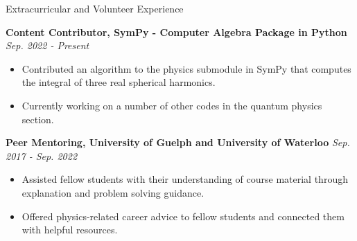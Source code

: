 \documentclass{resume} %
\begin{document}
\vspace{1em}

\begin{rSection}{Extracurricular and Volunteer Experience}


{\bf{Content Contributor, SymPy - Computer Algebra Package in Python}}
\hfill\textit{{Sep. 2022 - Present}}
\begin{itemize}
\item Contributed an algorithm to the physics submodule in SymPy that computes the integral of three real spherical harmonics.
\item Currently working on a number of other codes in the quantum physics section.
\end{itemize}


{\bf{Peer Mentoring, University of Guelph and University of Waterloo}}
\hfill\textit{{Sep. 2017 - Sep. 2022}}
\begin{itemize}
\item Assisted fellow students with their understanding of course material through explanation and problem solving guidance.
\item Offered physics-related career advice to fellow students and connected them with helpful resources.
\end{itemize}

\end{rSection}

\vspace{1em}
\end{document}
